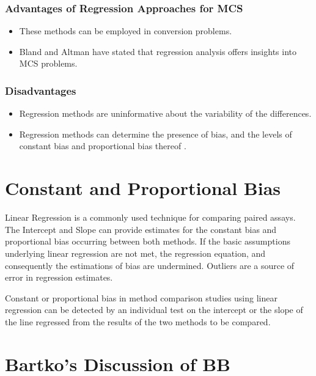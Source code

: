 \documentclass[12pt, a4paper]{report}
\theoremstyle{plain}
\theoremstyle{definition}
\theoremstyle{remark}
\begin{document}
\subsubsection{Advantages of Regression Approaches for MCS}
\begin{itemize}
	\item These methods can be employed in conversion problems.
	\item Bland and Altman have stated that regression analysis offers insights into MCS problems.
\end{itemize}
\subsubsection{Disadvantages}
\begin{itemize}
	\item Regression methods are uninformative about the variability of the differences.
\end{itemize}

\begin{itemize}\item
	Regression methods can determine the presence of bias, and the levels of constant bias and proportional bias thereof \cite{ludbrook97,ludbrook02}.
\end{itemize}


\section{Constant and Proportional Bias}

Linear Regression is a commonly used technique for comparing paired assays. The Intercept and Slope can provide estimates for the constant bias and proportional bias occurring between both methods. If the basic assumptions underlying linear regression are not met, the regression equation, and consequently the estimations
of bias are undermined. Outliers are a source of error in regression estimates.

Constant or proportional bias in method comparison studies using linear regression can be detected by an individual test on the intercept or the slope of the line regressed from the results of the two methods to be compared.





\section*{Bartko's Discussion of BB}
\end{document}
